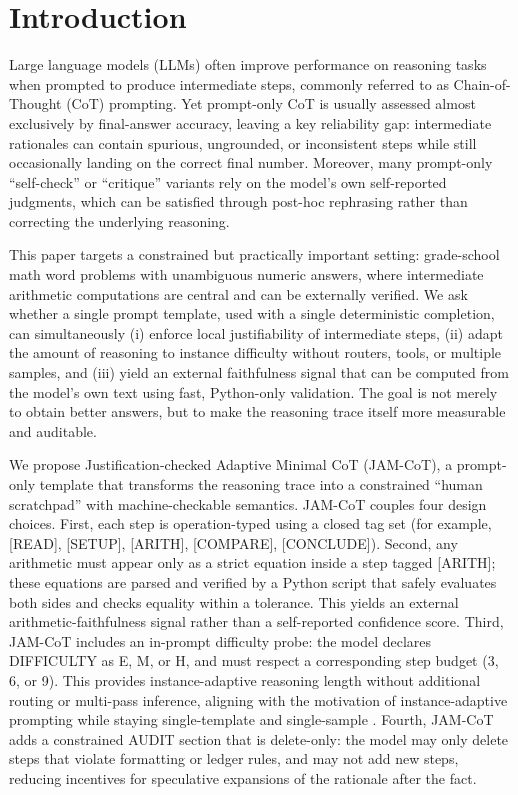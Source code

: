 \documentclass[journal,article,submit,pdftex,moreauthors]{Definitions/mdpi}
\begin{document}
\section{Introduction}

Large language models (LLMs) often improve performance on reasoning tasks when prompted to produce intermediate steps, commonly referred to as Chain-of-Thought (CoT) prompting. Yet prompt-only CoT is usually assessed almost exclusively by final-answer accuracy, leaving a key reliability gap: intermediate rationales can contain spurious, ungrounded, or inconsistent steps while still occasionally landing on the correct final number. Moreover, many prompt-only “self-check” or “critique” variants rely on the model’s own self-reported judgments, which can be satisfied through post-hoc rephrasing rather than correcting the underlying reasoning.

This paper targets a constrained but practically important setting: grade-school math word problems with unambiguous numeric answers, where intermediate arithmetic computations are central and can be externally verified. We ask whether a single prompt template, used with a single deterministic completion, can simultaneously (i) enforce local justifiability of intermediate steps, (ii) adapt the amount of reasoning to instance difficulty without routers, tools, or multiple samples, and (iii) yield an external faithfulness signal that can be computed from the model’s own text using fast, Python-only validation. The goal is not merely to obtain better answers, but to make the reasoning trace itself more measurable and auditable.

We propose Justification-checked Adaptive Minimal CoT (JAM-CoT), a prompt-only template that transforms the reasoning trace into a constrained “human scratchpad” with machine-checkable semantics. JAM-CoT couples four design choices. First, each step is operation-typed using a closed tag set (for example, [READ], [SETUP], [ARITH], [COMPARE], [CONCLUDE]). Second, any arithmetic must appear only as a strict equation inside a step tagged [ARITH]; these equations are parsed and verified by a Python script that safely evaluates both sides and checks equality within a tolerance. This yields an external arithmetic-faithfulness signal rather than a self-reported confidence score. Third, JAM-CoT includes an in-prompt difficulty probe: the model declares DIFFICULTY as E, M, or H, and must respect a corresponding step budget (3, 6, or 9). This provides instance-adaptive reasoning length without additional routing or multi-pass inference, aligning with the motivation of instance-adaptive prompting while staying single-template and single-sample \cite{gonzalez-2023-instance}. Fourth, JAM-CoT adds a constrained AUDIT section that is delete-only: the model may only delete steps that violate formatting or ledger rules, and may not add new steps, reducing incentives for speculative expansions of the rationale after the fact.
\end{document}
